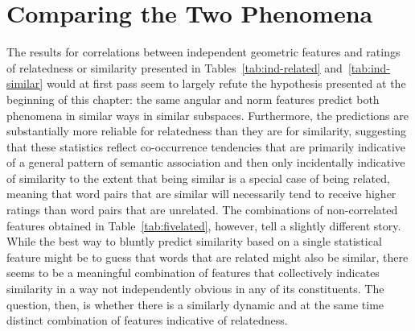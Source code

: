 \section{Comparing the Two Phenomena} \label{sec:litpare}
The results for correlations between independent geometric features and ratings of relatedness or similarity presented in Tables~\ref{tab:ind-related} and~\ref{tab:ind-similar} would at first pass seem to largely refute the hypothesis presented at the beginning of this chapter: the same angular and norm features predict both phenomena in similar ways in similar subspaces.  Furthermore, the predictions are substantially more reliable for relatedness than they are for similarity, suggesting that these statistics reflect co-occurrence tendencies that are primarily indicative of a general pattern of semantic association and then only incidentally indicative of similarity to the extent that being similar is a special case of being related, meaning that word pairs that are similar will necessarily tend to receive higher ratings than word pairs that are unrelated.  The combinations of non-correlated features obtained in Table~\ref{tab:fivelated}, however, tell a slightly different story.  While the best way to bluntly predict similarity based on a single statistical feature might be to guess that words that are related might also be similar, there seems to be a meaningful combination of features that collectively indicates similarity in a way not independently obvious in any of its constituents.  The question, then, is whether there is a similarly dynamic and at the same time distinct combination of features indicative of relatedness.

